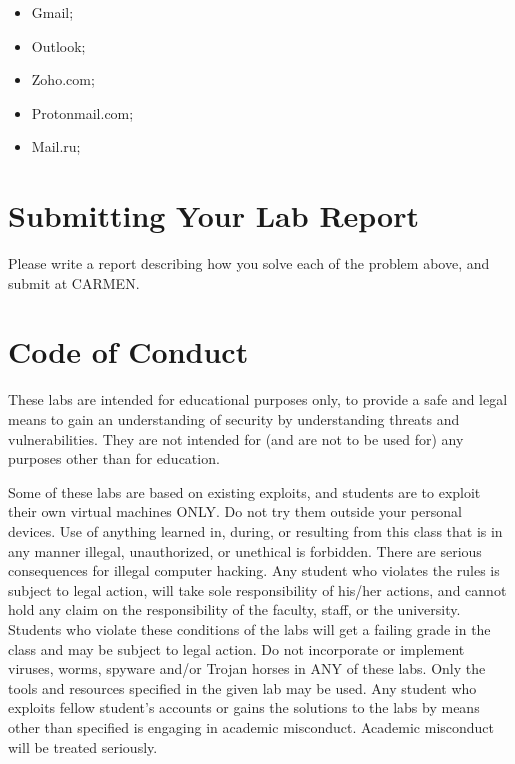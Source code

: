 \documentclass[11pt]{article}
\begin{document}
\begin{itemize}
\item Gmail;
\item Outlook;
\item Zoho.com;
\item Protonmail.com;
\item Mail.ru;

\end{itemize}




\section{Submitting Your Lab Report}

Please write a report describing how you solve each of the problem above, and submit at CARMEN.

\section{Code of Conduct}

These labs are intended for educational purposes only, to provide a safe and legal means to gain an understanding of security by understanding threats and vulnerabilities. They are not intended for (and are not to be used for) any purposes other than for education. 

Some of these labs are based on existing exploits, and students are to exploit their own virtual machines ONLY. Do not try them outside your personal devices. Use of anything learned in, during, or resulting from this class that is in any manner illegal, unauthorized, or unethical is forbidden. There are serious consequences for illegal computer hacking. Any student who violates the rules is subject to legal action, will take sole responsibility of his/her actions, and cannot hold any claim on the responsibility of the faculty, staff, or the university. Students who violate these conditions of the labs will get a failing grade in the class and may be subject to legal action. 
Do not incorporate or implement viruses, worms, spyware and/or Trojan horses in ANY of these labs. Only the tools and resources specified in the given lab may be used. Any student who exploits fellow student's accounts or gains the solutions to the labs by means other than specified is engaging in academic misconduct. Academic misconduct will be treated seriously. 
\end{document}
